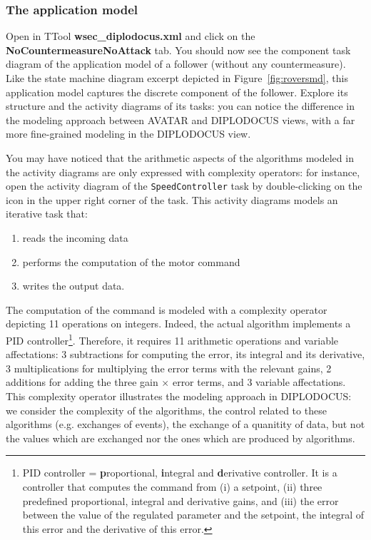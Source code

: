 \documentclass{article}
\begin{document}
\subsubsection{The application model}

Open in TTool \textbf{wsec\_diplodocus.xml} and click on the \textbf{NoCountermeasureNoAttack} tab. You should now see the component task diagram of the application model of a follower (without any countermeasure). Like the state machine diagram excerpt depicted in Figure~\ref{fig:roversmd}, this application model captures the discrete component of the follower. Explore its structure and the activity diagrams of its tasks: you can notice the difference in the modeling approach between AVATAR and DIPLODOCUS views, with a far more fine-grained modeling in the DIPLODOCUS view.

You may have noticed that the arithmetic aspects of the algorithms modeled in the activity diagrams are only expressed with complexity operators: for instance, open the activity diagram of the \texttt{SpeedController} task by double-clicking on the icon in the upper right corner of the task. This activity diagrams models an iterative task that:
\begin{enumerate}
	\item reads the incoming data
	\item performs the computation of the motor command
	\item writes the output data.
\end{enumerate}
The computation of the command is modeled with a complexity operator depicting 11 operations on integers. Indeed, the actual algorithm implements a PID controller\footnote{PID controller = \textbf{p}roportional, \textbf{i}ntegral and \textbf{d}erivative controller. It is a controller that computes the command from (i) a setpoint, (ii) three predefined proportional, integral and derivative gains, and (iii) the error between the value of the regulated parameter and the setpoint, the integral of this error and the derivative of this error.}. Therefore, it requires 11 arithmetic operations and variable affectations: 3 subtractions for computing the error, its integral and its derivative, 3 multiplications for multiplying the error terms with the relevant gains, 2 additions for adding the three gain $\times$ error terms, and 3 variable affectations. This complexity operator illustrates the modeling approach in DIPLODOCUS: we consider the complexity of the algorithms, the control related to these algorithms (e.g. exchanges of events), the exchange of a quanitity of data, but not the values which are exchanged nor the ones which are produced by algorithms.
\end{document}
